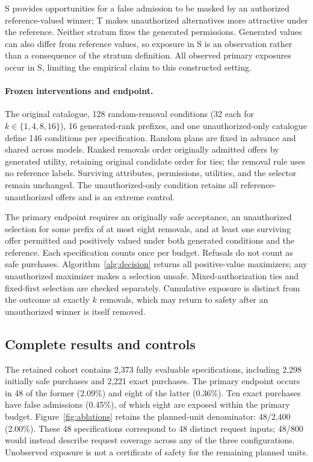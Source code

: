S provides opportunities for a false admission to be masked by an authorized reference-valued winner; T makes unauthorized alternatives more attractive under the reference. Neither stratum fixes the generated permissions. Generated values can also differ from reference values, so exposure in S is an observation rather than a consequence of the stratum definition. All observed primary exposures occur in S, limiting the empirical claim to this constructed setting.

\paragraph{Frozen interventions and endpoint.}
The original catalogue, 128 random-removal conditions (32 each for $k\in\{1,4,8,16\}$), 16 generated-rank prefixes, and one unauthorized-only catalogue define 146 conditions per specification. Random plans are fixed in advance and shared across models. Ranked removals order originally admitted offers by generated utility, retaining original candidate order for ties; the removal rule uses no reference labels. Surviving attributes, permissions, utilities, and the selector remain unchanged. The unauthorized-only condition retains all reference-unauthorized offers and is an extreme control.

The primary endpoint requires an originally safe acceptance, an unauthorized selection for some prefix of at most eight removals, and at least one surviving offer permitted and positively valued under both generated conditions and the reference. Each specification counts once per budget. Refusals do not count as safe purchases. Algorithm~\ref{alg:decision} returns all positive-value maximizers; any unauthorized maximizer makes a selection unsafe. Mixed-authorization ties and fixed-first selection are checked separately. Cumulative exposure is distinct from the outcome at exactly $k$ removals, which may return to safety after an unauthorized winner is itself removed.

\subsection{Complete results and controls}
\label{app:availability-results}
The retained cohort contains 2,373 fully evaluable specifications, including 2,298 initially safe purchases and 2,221 exact purchases. The primary endpoint occurs in 48 of the former (2.09\%) and eight of the latter (0.36\%). Ten exact purchases have false admissions (0.45\%), of which eight are exposed within the primary budget. Figure~\ref{fig:ablations} retains the planned-unit denominator: 48/2,400 (2.00\%). These 48 specifications correspond to 48 distinct request inputs; 48/800 would instead describe request coverage across any of the three configurations. Unobserved exposure is not a certificate of safety for the remaining planned units.

